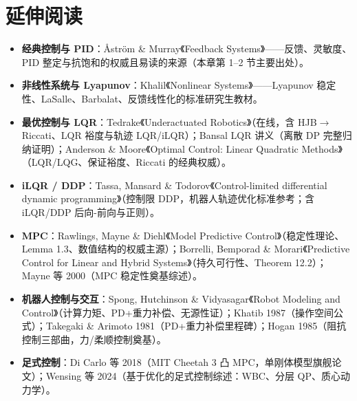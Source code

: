 \section*{延伸阅读}
\begin{itemize}
  \item \textbf{经典控制与 PID}：Åström \& Murray《Feedback Systems》\cite{astrom2008feedback}——反馈、灵敏度、PID 整定与抗饱和的权威且易读的来源（本章第 1--2 节主要出处）。
  \item \textbf{非线性系统与 Lyapunov}：Khalil《Nonlinear Systems》\cite{khalil2002nonlinear}——Lyapunov 稳定性、LaSalle、Barbalat、反馈线性化的标准研究生教材。
  \item \textbf{最优控制与 LQR}：Tedrake《Underactuated Robotics》\cite{tedrake_underactuated}（在线，含 HJB$\to$Riccati、LQR 裕度与轨迹 LQR/iLQR）；Bansal LQR 讲义\cite{bansal2017lqr}（离散 DP 完整归纳证明）；Anderson \& Moore《Optimal Control: Linear Quadratic Methods》\cite{anderson2007optimal}（LQR/LQG、保证裕度、Riccati 的经典权威）。
  \item \textbf{iLQR / DDP}：Tassa, Mansard \& Todorov《Control-limited differential dynamic programming》\cite{tassa2014ddp}（控制限 DDP，机器人轨迹优化标准参考；含 iLQR/DDP 后向-前向与正则）。
  \item \textbf{MPC}：Rawlings, Mayne \& Diehl《Model Predictive Control》\cite{rawlings2020mpc}（稳定性理论、Lemma 1.3、数值结构的权威主源）；Borrelli, Bemporad \& Morari《Predictive Control for Linear and Hybrid Systems》\cite{borrelli2017predictive}（持久可行性、Theorem 12.2）；Mayne 等 2000\cite{mayne2000constrained}（MPC 稳定性奠基综述）。
  \item \textbf{机器人控制与交互}：Spong, Hutchinson \& Vidyasagar《Robot Modeling and Control》\cite{spong2006robot}（计算力矩、PD+重力补偿、无源性证）；Khatib 1987\cite{khatib1987operational}（操作空间公式）；Takegaki \& Arimoto 1981\cite{takegaki1981feedback}（PD+重力补偿里程碑）；Hogan 1985\cite{hogan1985impedance}（阻抗控制三部曲，力/柔顺控制奠基）。
  \item \textbf{足式控制}：Di Carlo 等 2018\cite{dicarlo2018cheetah}（MIT Cheetah 3 凸 MPC，单刚体模型旗舰论文）；Wensing 等 2024\cite{wensing2024legged}（基于优化的足式控制综述：WBC、分层 QP、质心动力学）。
\end{itemize}

